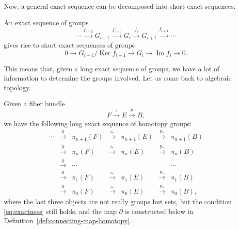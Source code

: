 \documentclass[12pt]{article}
\numberwithin{equation}{section}
\theoremstyle{remark}
\def\Ker{\mathop{\mathrm{Ker}}}
\def\Im{\mathop{\mathrm{Im}}}
\begin{document}
Now, a general exact sequence can be decomposed into short exact sequences:
\begin{proposition}
  An exact sequence of groups\begin{equation}
    \cdots 
    \stackrel{f_{i-2}}{\longrightarrow} G_{i-1} 
    \stackrel{f_{i-1}}{\longrightarrow} G_{i}
    \stackrel{f_{i}}{\longrightarrow} G_{i+1}
    \stackrel{f_{i+1}}{\longrightarrow} \cdots
  \end{equation}
  gives rise to short exact sequences of groups \begin{equation}
    0 \to G_{i-1}/\Ker f_{i-1} \to G_i \to \Im f_{i} \to 0.
  \end{equation}
\end{proposition}

This means that, given a long exact sequence of groups,
we have a lot of information to determine the groups involved.
Let us come back to algebraic topology.
\begin{theorem}
  \label{thm:long-exact-seq-homotopy}
  Given a fiber bundle \begin{equation}
    F\stackrel{\iota}{\longrightarrow} E\stackrel{p}{\longrightarrow} B,
  \end{equation}
  we have the following long exact sequence of homotopy groups: 
  \begin{equation}\begin{array}{cccccccc}
    \cdots 
      & \stackrel{\partial}{\longrightarrow} & \pi_{n+1}(F)  
      & \stackrel{\iota_*}{\longrightarrow} & \pi_{n+1}(E)
      & \stackrel{p_*}{\longrightarrow} & \pi_{n+1}(B)  \\
      & \stackrel{\partial}{\longrightarrow} & \pi_{n}(F)  
      & \stackrel{\iota_*}{\longrightarrow} & \pi_{n}(E)
      & \stackrel{p_*}{\longrightarrow} & \pi_{n}(B)  \\
      & \stackrel{\partial}{\longrightarrow} & \cdots & &&& \cdots \\
      & \stackrel{\partial}{\longrightarrow} & \pi_{1}(F)  
      & \stackrel{\iota_*}{\longrightarrow} & \pi_{1}(E)
      & \stackrel{p_*}{\longrightarrow} & \pi_{1}(B) \\
      & \stackrel{\partial}{\longrightarrow} & \pi_{0}(F)  
      & \stackrel{\iota_*}{\longrightarrow} & \pi_{0}(E)
      & \stackrel{p_*}{\longrightarrow} & \pi_{0}(B),
      \end{array}\end{equation}
      where the last three objects are not really groups but sets,
      but the condition \eqref{eq:exactness} still holds,
      and the map $\partial$ is constructed below in Definition~\ref{def:connecting-map-homotopy}.  
\end{theorem}
\end{document}
